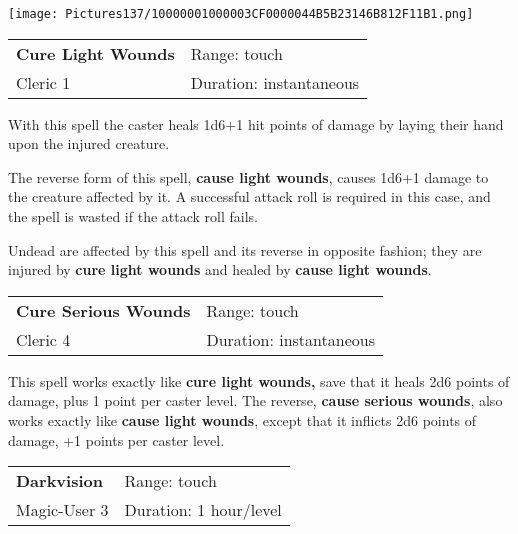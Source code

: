 \documentclass[a4paper,twoside,openany,10pt]{book}
\begin{document}
\begin{multicols}{2}
\begin{flushleft}
	\texttt{[image: Pictures137/10000001000003CF0000044B5B23146B812F11B1.png]}
\end{flushleft}

\smallskip\begin{flushleft} 
	\begin{tabularx}{0.45\textwidth}{@{}m{3.5cm}m{5.5cm}@{}} 
		\textbf{Cure Light Wounds } & Range: touch\\
		Cleric 1 &Duration: instantaneous\\
	\end{tabularx}\end{flushleft}

With this spell the caster heals 1d6+1 hit points of damage by laying
their hand upon the injured creature.

The reverse form of this spell, \textbf{cause light wounds}, causes 1d6+1 damage to the creature affected by it. A successful attack roll is required in this case, and the spell is wasted if the attack roll fails.

Undead are affected by this spell and its reverse in opposite fashion; they are injured by \textbf{cure light wounds} and healed by \textbf{cause light wounds}.

\smallskip\begin{flushleft} 
	\begin{tabularx}{0.45\textwidth}{@{}m{3.5cm}m{5.5cm}@{}} 
		\textbf{Cure Serious Wounds} & Range: touch\\
		Cleric 4 &Duration: instantaneous\\
	\end{tabularx}\end{flushleft}

This spell works exactly like \textbf{cure light wounds,} save that it heals 2d6 points of damage, plus 1 point per caster level. The reverse, \textbf{cause serious wounds}, also works exactly like \textbf{cause light wounds}, except that it inflicts 2d6 points of damage, +1 points per caster level.\medskip


\smallskip\begin{flushleft} 
	\begin{tabularx}{0.45\textwidth}{@{}m{3.5cm}m{5.5cm}@{}} 
		\textbf{Darkvision} & Range: touch\\
Magic-User 3 &Duration: 1 hour/level\\
	\end{tabularx}\end{flushleft}


\end{multicols}
\end{document}
